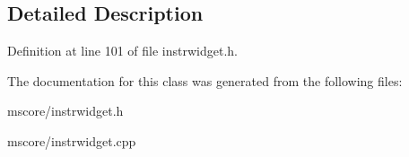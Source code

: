 \subsection{Detailed Description}


Definition at line 101 of file instrwidget.\+h.



The documentation for this class was generated from the following files\+:\begin{DoxyCompactItemize}
\item 
mscore/instrwidget.\+h\item 
mscore/instrwidget.\+cpp\end{DoxyCompactItemize}
